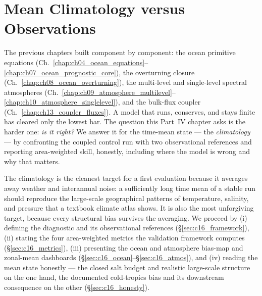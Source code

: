 \chapter{Mean Climatology versus Observations}\label{chap:ch16_climatology}

\providecommand{\bias}{\overline{\Delta}}          %
\providecommand{\rmse}{\mathrm{RMSE}}              %
\providecommand{\corrp}{r}                          %
\providecommand{\stdr}{\sigma_{\mathrm{r}}}        %
\providecommand{\wcell}{w_{ij}}                     %
\providecommand{\Tair}{T_{2\mathrm{m}}}            %

The previous chapters built \model{} component by component: the ocean primitive
equations (Ch.~\ref{chap:ch04_ocean_equations}--\ref{chap:ch07_ocean_prognostic_core}),
the overturning closure (Ch.~\ref{chap:ch08_ocean_overturning}), the multi-level
\dino{} and single-level spectral atmospheres
(Ch.~\ref{chap:ch09_atmosphere_multilevel}--\ref{chap:ch10_atmosphere_singlelevel}),
and the bulk-flux coupler (Ch.~\ref{chap:ch13_coupler_fluxes}). A model that
runs, conserves, and stays finite has cleared only the lowest bar. The question
this Part~IV chapter asks is the harder one: \emph{is it right?} We answer it for
the time-mean state --- the \emph{climatology} --- by confronting the coupled
control run with two observational references and reporting area-weighted skill,
honestly, including where the model is wrong and why that matters.

The climatology is the cleanest target for a first evaluation because it
averages away weather and interannual noise: a sufficiently long time mean of a
stable run should reproduce the large-scale geographical patterns of
temperature, salinity, and pressure that a textbook climate atlas shows. It is
also the most unforgiving target, because every structural bias survives the
averaging. We proceed by (i) defining the diagnostic and its observational
references (\S\ref{sec:c16_framework}), (ii) stating the four area-weighted
metrics the validation framework computes (\S\ref{sec:c16_metrics}), (iii)
presenting the ocean and atmosphere bias-map and zonal-mean dashboards
(\S\ref{sec:c16_ocean}--\S\ref{sec:c16_atmos}), and (iv) reading the mean state
honestly --- the closed salt budget and realistic large-scale structure on the
one hand, the documented cold-tropics bias and its downstream consequence on the
other (\S\ref{sec:c16_honesty}).

